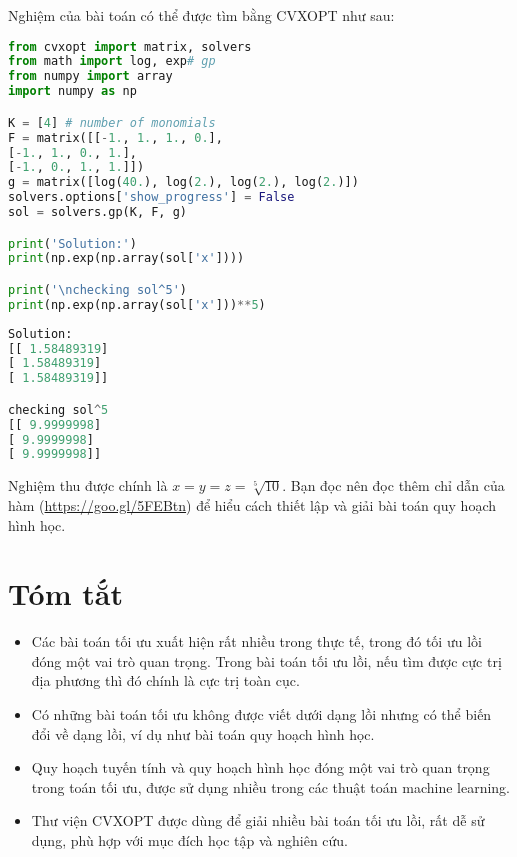Nghiệm của bài toán có thể được tìm bằng CVXOPT như sau:
\begin{lstlisting}[language=Python]
from cvxopt import matrix, solvers
from math import log, exp# gp
from numpy import array
import numpy as np

K = [4] # number of monomials
F = matrix([[-1., 1., 1., 0.],
[-1., 1., 0., 1.],
[-1., 0., 1., 1.]])
g = matrix([log(40.), log(2.), log(2.), log(2.)])
solvers.options['show_progress'] = False
sol = solvers.gp(K, F, g)

print('Solution:')
print(np.exp(np.array(sol['x'])))

print('\nchecking sol^5')
print(np.exp(np.array(sol['x']))**5)
\end{lstlisting}
\kq
\begin{lstlisting}[language=Python]
Solution:
[[ 1.58489319]
[ 1.58489319]
[ 1.58489319]]

checking sol^5
[[ 9.9999998]
[ 9.9999998]
[ 9.9999998]]
\end{lstlisting}

Nghiệm thu được chính là $x = y = z = \sqrt[5]{10}$. Bạn đọc nên
đọc thêm chỉ dẫn của hàm  (\url{https://goo.gl/5FEBtn})
để hiểu cách thiết lập và giải bài toán quy hoạch hình học.


\section{Tóm tắt}
\begin{itemize}
\item Các bài toán tối ưu xuất hiện rất nhiều trong thực tế, trong đó tối ưu
lồi đóng một vai trò quan trọng. Trong bài toán tối ưu lồi, nếu tìm được cực
trị địa phương thì đó chính là cực trị toàn cục.

\item Có những bài toán tối ưu không được viết dưới dạng lồi nhưng có thể
biến đổi về dạng lồi, ví dụ như bài toán quy hoạch hình học.

\item Quy hoạch tuyến tính và quy hoạch hình học đóng một vai trò quan
trọng trong toán tối ưu, được sử dụng nhiều trong các thuật toán machine
learning.

\item Thư viện CVXOPT được dùng để giải nhiều bài toán tối ưu lồi, rất dễ
sử dụng, phù hợp với mục đích học tập và nghiên cứu.

\end{itemize}



